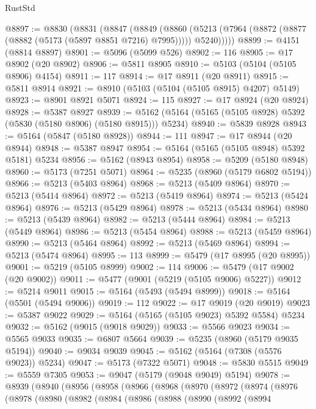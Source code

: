 \begin{lexlean}{RustStd}
\begin{coremodule}
@8897 := @8830
    (@8831
      (@8847
        (@8849
          (@8860 (@5213 (@7964 (@8872 (@8877 (@8882 (@5173 (@5897 @8851 @7216) @7995))))) @5240)))))
@8899 := @4151 (@8814 @8897)
@8901 := @5096 (@5099 @526)
@8902 := 116
@8905 := @17 @8902 (@20 @8902)
@8906 := @5811 @8905
@8910 := @5103 (@5104 (@5105 @8906) @4154)
@8911 := 117
@8914 := @17 @8911 (@20 @8911)
@8915 := @5811 @8914
@8921 := @8910 (@5103 (@5104 (@5105 @8915) @4207) @5149)
@8923 := @8901 @8921 @5071
@8924 := 115
@8927 := @17 @8924 (@20 @8924)
@8928 := @5387 @8927
@8939 := @5162 (@5164 (@5165 (@5105 @8928) @5392 (@5830 (@5180 @8906) (@5180 @8915))) @5234)
@8940 := @5839 @8928
@8943 := @5164 (@5847 (@5180 @8928))
@8944 := 111
@8947 := @17 @8944 (@20 @8944)
@8948 := @5387 @8947
@8954 := @5164 (@5165 (@5105 @8948) @5392 @5181) @5234
@8956 := @5162 (@8943 @8954)
@8958 := @5209 (@5180 @8948)
@8960 := @5173 (@7251 @5071)
@8964 := @5235 (@8960 (@5179 @6802 @5194))
@8966 := @5213 (@5403 @8964)
@8968 := @5213 (@5409 @8964)
@8970 := @5213 (@5414 @8964)
@8972 := @5213 (@5419 @8964)
@8974 := @5213 (@5424 @8964)
@8976 := @5213 (@5429 @8964)
@8978 := @5213 (@5434 @8964)
@8980 := @5213 (@5439 @8964)
@8982 := @5213 (@5444 @8964)
@8984 := @5213 (@5449 @8964)
@8986 := @5213 (@5454 @8964)
@8988 := @5213 (@5459 @8964)
@8990 := @5213 (@5464 @8964)
@8992 := @5213 (@5469 @8964)
@8994 := @5213 (@5474 @8964)
@8995 := 113
@8999 := @5479 (@17 @8995 (@20 @8995))
@9001 := @5219 (@5105 @8999)
@9002 := 114
@9006 := @5479 (@17 @9002 (@20 @9002))
@9011 := @5477 (@9001 (@5219 (@5105 @9006) @5227))
@9012 := @5214 @9011
@9015 := @5164 (@5493 (@5494 @8999))
@9018 := @5164 (@5501 (@5494 @9006))
@9019 := 112
@9022 := @17 @9019 (@20 @9019)
@9023 := @5387 @9022
@9029 := @5164 (@5165 (@5105 @9023) @5392 @5584) @5234
@9032 := @5162 (@9015 (@9018 @9029))
@9033 := @5566 @9023
@9034 := @5565 @9033
@9035 := @6807 @5664
@9039 := @5235 (@8960 (@5179 @9035 @5194))
@9040 := @9034 @9039
@9045 := @5162 (@5164 (@7308 (@5576 @9023)) @5234)
@9047 := @5173 (@7322 @5071)
@9048 := @5830 @5515
@9049 := @5559 @7305
@9053 := @9047 (@5179 (@9048 @9049) @5194)
@9078 := @8939
    (@8940
      (@8956
        (@8958
          (@8966
            (@8968
              (@8970
                (@8972
                  (@8974
                    (@8976
                      (@8978
                        (@8980
                          (@8982
                            (@8984
                              (@8986
                                (@8988
                                  (@8990
                                    (@8992
                                      (@8994

\end{coremodule}
\end{lexlean}
